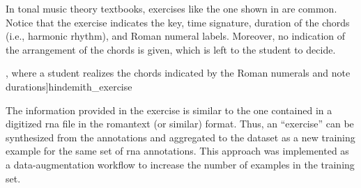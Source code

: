 
In tonal music theory textbooks, exercises like the one
shown in  are common. Notice that
the exercise indicates the key, time signature, duration of
the chords (i.e., harmonic rhythm), and Roman numeral
labels. Moreover, no indication of the arrangement of the
chords is given, which is left to the student to decide. 

\phdfigure[Harmony exercise in \textcite[p.
7]{hindemith1943concentrated}, where a student
\glspl{realize} the chords indicated by the Roman numerals
and note durations]{hindemith_exercise}

The information provided in the exercise is similar to the
one contained in a digitized \gls{rna} file in the
\gls{romantext} (or similar) format. Thus, an ``exercise''
can be synthesized from the annotations and aggregated to
the dataset as a new training example for the same set of
\gls{rna} annotations. This approach was implemented as a
data-augmentation workflow to increase the number of
examples in the training set.
